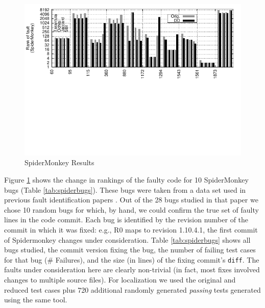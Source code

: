 \begin{figure}[t]
  \centering
\includegraphics[scale=1.1]{naspidermonkey} 
 \vspace{-2in}
  \caption{SpiderMonkey Results}
  \label{fig:spidermonkey}
\end{figure}

Figure \ref{fig:spidermonkey} shows the change in rankings of the
faulty code for 10 SpiderMonkey bugs (Table \ref{tab:spiderbugs}).
These bugs were taken from a data set used in previous fault identification papers \cite{PLDI13,ISSRE18}.  Out
of the 28 bugs studied in that paper we chose 10 random bugs for which, by
hand, we could confirm the true set of faulty lines in the code
commit.  Each bug is identified by the revision number of the commit
in which it was fixed: e.g., R0 maps to revision 1.10.4.1, the first
commit of Spidermonkey changes under consideration. Table
\ref{tab:spiderbugs} shows all bugs studied, the commit version fixing
the bug, the number of failing test cases for that bug (\# Failures),
and the size (in lines) of the fixing commit's {\tt diff}.  The faults
under consideration here are clearly non-trivial (in fact, most fixes
involved changes to multiple source files).  For localization we
used the original and reduced test cases \cite{PLDI13}
plus 720 additional randomly generated \emph{passing} tests generated
using the same tool.

